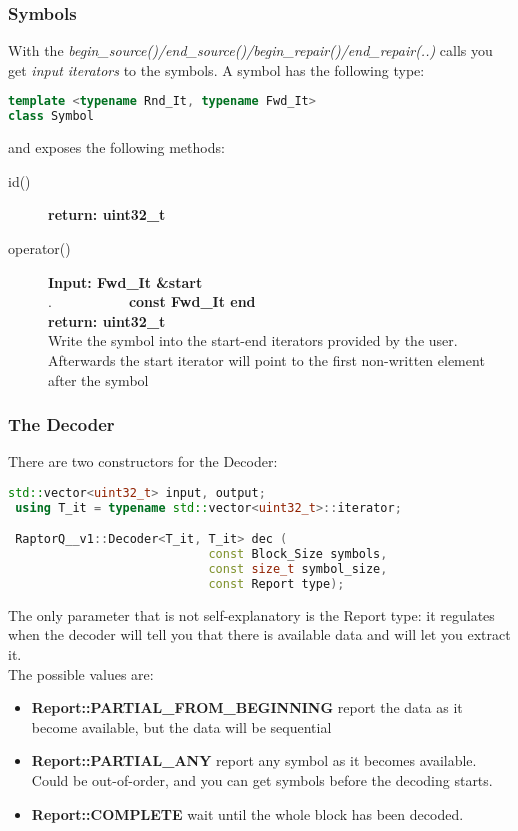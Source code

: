 \documentclass[11pt,a4paper]{refart}
\begin{document}
\subsubsection{Symbols}
With the \textit{begin\_source()/end\_source()/begin\_repair()/end\_repair(..)} calls you get \textit{input iterators} to the symbols. A symbol has the following type:
\begin{lstlisting}[language=C++]
template <typename Rnd_It, typename Fwd_It>
class Symbol
\end{lstlisting}
and exposes the	 following methods:
\begin{description}
\item[id()]\textbf{return: uint32\_t}
\item[operator()]\textbf{Input: Fwd\_It \&start}\\
.\ \ \ \ \ \ \ \ \ \ \ \textbf{const Fwd\_It end}\\
\textbf{return: uint32\_t}\\
Write the symbol into the start-end iterators provided by the user. Afterwards the start iterator will point to the first non-written element after the symbol
\end{description}



\newpage
\subsubsection{The Decoder}

There are two constructors for the Decoder:

\begin{lstlisting}[language=C++]
 std::vector<uint32_t> input, output;
 using T_it = typename std::vector<uint32_t>::iterator;

 RaptorQ__v1::Decoder<T_it, T_it> dec (
 							const Block_Size symbols,
 							const size_t symbol_size,
							const Report type);

\end{lstlisting}

The only parameter that is not self-explanatory is the Report type: it regulates when the decoder will tell you that there is available data and will let you extract it.\\
The possible values are:

\begin{itemize}
	\item \textbf{Report::PARTIAL\_FROM\_BEGINNING} report the data as it become available, but the data will be sequential
	\item \textbf{Report::PARTIAL\_ANY} report any symbol as it becomes available. Could be out-of-order, and you can get symbols before the decoding starts.
	\item \textbf{Report::COMPLETE} wait until the whole block has been decoded.
\end{itemize}
\end{document}
